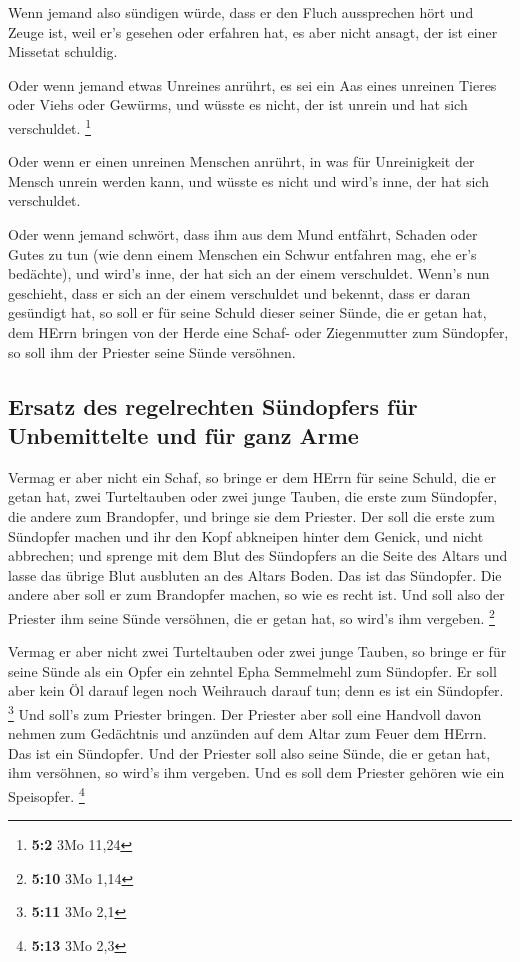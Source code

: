  Wenn jemand also sündigen würde, dass er den Fluch
aussprechen hört und Zeuge ist, weil er's gesehen oder erfahren hat, es
aber nicht ansagt, der ist einer Missetat schuldig.

 Oder wenn jemand etwas Unreines anrührt, es sei ein Aas
eines unreinen Tieres oder Viehs oder Gewürms, und wüsste es nicht, der
ist unrein und hat sich verschuldet. \footnote{\textbf{5:2} 3Mo 11,24}

 Oder wenn er einen unreinen Menschen anrührt, in was für
Unreinigkeit der Mensch unrein werden kann, und wüsste es nicht und
wird's inne, der hat sich verschuldet.

 Oder wenn jemand schwört, dass ihm aus dem Mund entfährt,
Schaden oder Gutes zu tun (wie denn einem Menschen ein Schwur entfahren
mag, ehe er's bedächte), und wird's inne, der hat sich an der einem
verschuldet.  Wenn's nun geschieht, dass er sich an der
einem verschuldet und bekennt, dass er daran gesündigt hat,
 so soll er für seine Schuld dieser seiner Sünde, die er
getan hat, dem HErrn bringen von der Herde eine Schaf- oder Ziegenmutter
zum Sündopfer, so soll ihm der Priester seine Sünde versöhnen.

\hypertarget{ersatz-des-regelrechten-suxfcndopfers-fuxfcr-unbemittelte-und-fuxfcr-ganz-arme}{%
\subsection{Ersatz des regelrechten Sündopfers für Unbemittelte und für
ganz
Arme}\label{ersatz-des-regelrechten-suxfcndopfers-fuxfcr-unbemittelte-und-fuxfcr-ganz-arme}}

 Vermag er aber nicht ein Schaf, so bringe er dem HErrn
für seine Schuld, die er getan hat, zwei Turteltauben oder zwei junge
Tauben, die erste zum Sündopfer, die andere zum Brandopfer,
 und bringe sie dem Priester. Der soll die erste zum
Sündopfer machen und ihr den Kopf abkneipen hinter dem Genick, und nicht
abbrechen;  und sprenge mit dem Blut des Sündopfers an die
Seite des Altars und lasse das übrige Blut ausbluten an des Altars
Boden. Das ist das Sündopfer.  Die andere aber soll er
zum Brandopfer machen, so wie es recht ist. Und soll also der Priester
ihm seine Sünde versöhnen, die er getan hat, so wird's ihm vergeben.
\footnote{\textbf{5:10} 3Mo 1,14}

 Vermag er aber nicht zwei Turteltauben oder zwei junge
Tauben, so bringe er für seine Sünde als ein Opfer ein zehntel Epha
Semmelmehl zum Sündopfer. Er soll aber kein Öl darauf legen noch
Weihrauch darauf tun; denn es ist ein Sündopfer. \footnote{\textbf{5:11}
  3Mo 2,1}  Und soll's zum Priester bringen. Der Priester
aber soll eine Handvoll davon nehmen zum Gedächtnis und anzünden auf dem
Altar zum Feuer dem HErrn. Das ist ein Sündopfer.  Und
der Priester soll also seine Sünde, die er getan hat, ihm versöhnen, so
wird's ihm vergeben. Und es soll dem Priester gehören wie ein
Speisopfer. \footnote{\textbf{5:13} 3Mo 2,3}

